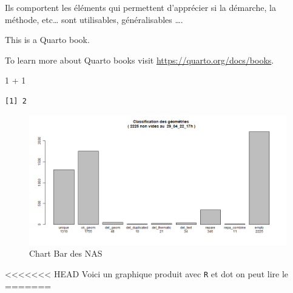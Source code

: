 \documentclass[
  a4paper,
]{scrbook}
\newenvironment{Shaded}{}{}
\newcommand{\AttributeTok}[1]{\textcolor[rgb]{0.84,0.23,0.29}{#1}}
\newcommand{\DecValTok}[1]{\textcolor[rgb]{0.00,0.36,0.77}{#1}}
\newcommand{\FunctionTok}[1]{\textcolor[rgb]{0.44,0.26,0.76}{#1}}
\newcommand{\NormalTok}[1]{\textcolor[rgb]{0.14,0.16,0.18}{#1}}
\newcommand{\OtherTok}[1]{\textcolor[rgb]{0.44,0.26,0.76}{#1}}
\newcommand{\SpecialCharTok}[1]{\textcolor[rgb]{0.00,0.36,0.77}{#1}}
\newcommand{\StringTok}[1]{\textcolor[rgb]{0.01,0.18,0.38}{#1}}
\begin{document}
Ils comportent les éléments qui permettent d'apprécier si la démarche,
la méthode, etc\ldots{} sont utilisables, généralisables \ldots.

This is a Quarto book.

To learn more about Quarto books visit
\url{https://quarto.org/docs/books}.

\begin{Shaded}
\begin{Highlighting}[numbers=left,,]
\DecValTok{1} \SpecialCharTok{+} \DecValTok{1}
\end{Highlighting}
\end{Shaded}

\begin{verbatim}
[1] 2
\end{verbatim}

\begin{figure}

{\centering \includegraphics{./figures/bar_classify_Del_29_04_22_17h.png}

}

\caption{Chart Bar des NAS}

\end{figure}

<<<<<<< HEAD
Voici un graphique produit avec \texttt{R} et dot on peut lire le
=======
\begin{Shaded}
\end{Shaded}
\end{document}
